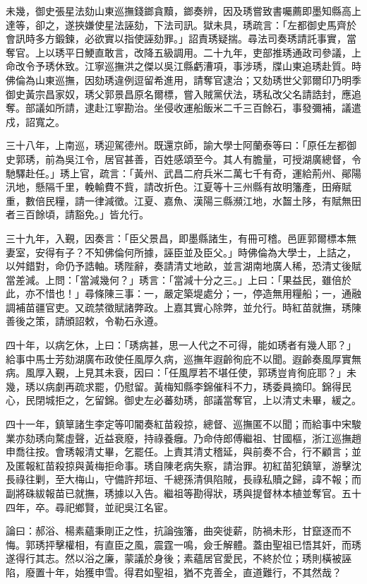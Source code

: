 \begin{pinyinscope}
未幾，御史張星法劾山東巡撫錢鎯貪黷，鎯奏辨，因及琇嘗致書囑薦即墨知縣高上達等，卻之，遂挾嫌使星法誣劾，下法司訊。獄未具，琇疏言：「左都御史馬齊於會訊時多方鍛鍊，必欲實以指使誣劾罪。」詔責琇疑揣。尋法司奏琇請託事實，當奪官。上以琇平日鯁直敢言，改降五級調用。二十九年，吏部推琇通政司參議，上命改令予琇休致。江寧巡撫洪之傑以吳江縣虧漕項，事涉琇，牒山東追琇赴質。時佛倫為山東巡撫，因劾琇違例逗留希進用，請奪官逮治；又劾琇世父郭爾印乃明季御史黃宗昌家奴，琇父郭景昌原名爾標，嘗入賊黨伏法，琇私改父名請誥封，應追奪。部議如所請，逮赴江寧勘治。坐侵收運船飯米二千三百餘石，事發彌補，議遣戍，詔寬之。

三十八年，上南巡，琇迎駕德州。既還京師，諭大學士阿蘭泰等曰：「原任左都御史郭琇，前為吳江令，居官甚善，百姓感頌至今。其人有膽量，可授湖廣總督，令馳驛赴任。」琇上官，疏言：「黃州、武昌二府兵米二萬七千有奇，運給荊州、鄖陽汛地，懸隔千里，輓輸費不貲，請改折色。江夏等十三州縣有故明籓產，田瘠賦重，數倍民糧，請一律減徵。江夏、嘉魚、漢陽三縣瀕江地，水齧土陊，有賦無田者三百餘頃，請豁免。」皆允行。

三十九年，入覲，因奏言：「臣父景昌，即墨縣諸生，有冊可稽。邑匪郭爾標本無妻室，安得有子？不知佛倫何所據，誣臣並及臣父。」時佛倫為大學士，上詰之，以舛錯對，命仍予誥軸。琇陛辭，奏請清丈地畝，並言湖南地廣人稀，恐清丈後賦當差減。上問：「當減幾何？」琇言：「當減十分之三。」上曰：「果益民，雖倍於此，亦不惜也！」尋條陳三事：一，嚴定築堤處分；一，停造無用糧船；一，通融調補苗疆官吏。又疏禁徵賦諸弊政。上嘉其實心除弊，並允行。時紅苗就撫，琇陳善後之策，請頒詔敕，令勒石永遵。

四十年，以病乞休，上曰：「琇病甚，思一人代之不可得，能如琇者有幾人耶？」給事中馬士芳劾湖廣布政使任風厚久病，巡撫年遐齡徇庇不以聞。遐齡奏風厚實無病。風厚入覲，上見其未衰，因曰：「任風厚若不堪任使，郭琇豈肯徇庇耶？」未幾，琇以病劇再疏求罷，仍慰留。黃梅知縣李錦催科不力，琇委員摘印。錦得民心，民閉城拒之，乞留錦。御史左必蕃劾琇，部議當奪官，上以清丈未畢，緩之。

四十一年，鎮筸諸生李定等叩閽奏紅苗殺掠，總督、巡撫匿不以聞；而給事中宋駿業亦劾琇向騖虛聲，近益衰廢，持祿養癰。乃命侍郎傅繼祖、甘國樞，浙江巡撫趙申喬往按。會琇報清丈畢，乞罷任。上責其清丈稽延，與前奏不合，行不顧言；並及匿報紅苗殺掠與黃梅拒命事。琇自陳老病失察，請治罪。初紅苗犯鎮筸，游擊沈長祿往剿，至大梅山，守備許邦垣、千總孫清俱陷賊，長祿私贖之歸，諱不報；而副將硃紱報苗已就撫，琇據以入告。繼祖等勘得狀，琇與提督林本植並奪官。五十四年，卒。尋祀鄉賢，並祀吳江名宦。

論曰：郝浴、楊素蘊秉剛正之性，抗論強籓，曲突徙薪，防禍未形，甘竄逐而不悔。郭琇抨擊權相，有直臣之風，震霆一鳴，僉壬解體。蓋由聖祖已悟其奸，而琇遂得行其志。然以浴之廉，蒙議於身後；素蘊居官愛民，不終於位；琇則橫被誣陷，廢置十年，始獲申雪。得君如聖祖，猶不克善全，直道難行，不其然哉？


\end{pinyinscope}
